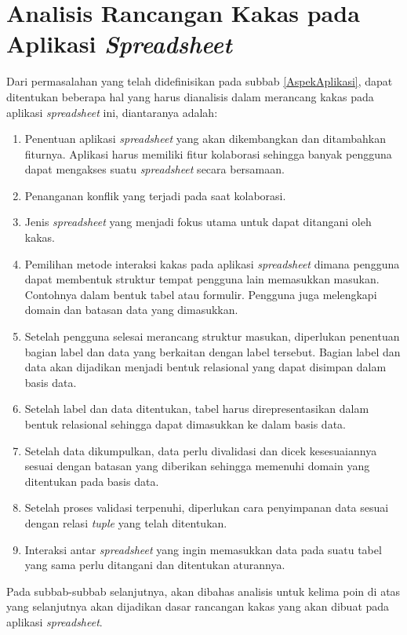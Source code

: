 \section{Analisis Rancangan Kakas pada Aplikasi \textit{Spreadsheet}}
Dari permasalahan yang telah didefinisikan pada subbab \ref{AspekAplikasi}, dapat ditentukan beberapa hal yang harus dianalisis dalam merancang kakas pada aplikasi \textit{spreadsheet} ini, diantaranya adalah:
\begin{enumerate}
	\item Penentuan aplikasi \textit{spreadsheet} yang akan dikembangkan dan ditambahkan fiturnya. Aplikasi harus memiliki fitur kolaborasi sehingga banyak pengguna dapat mengakses suatu \textit{spreadsheet} secara bersamaan.
	\item Penanganan konflik yang terjadi pada saat kolaborasi.
	\item Jenis \textit{spreadsheet} yang menjadi fokus utama untuk dapat ditangani oleh kakas.
	\item Pemilihan metode interaksi kakas pada aplikasi \textit{spreadsheet} dimana pengguna dapat membentuk struktur tempat pengguna lain memasukkan masukan. Contohnya dalam bentuk tabel atau formulir. Pengguna juga melengkapi domain dan batasan data yang dimasukkan.
	\item Setelah pengguna selesai merancang struktur masukan, diperlukan penentuan bagian label dan data yang berkaitan dengan label tersebut. Bagian label dan data akan dijadikan menjadi bentuk relasional yang dapat disimpan dalam basis data.
	\item Setelah label dan data ditentukan, tabel harus direpresentasikan dalam bentuk relasional sehingga dapat dimasukkan ke dalam basis data.
	\item Setelah data dikumpulkan, data perlu divalidasi dan dicek kesesuaiannya sesuai dengan batasan yang diberikan sehingga memenuhi domain yang ditentukan pada basis data.
	\item Setelah proses validasi terpenuhi, diperlukan cara penyimpanan data sesuai dengan relasi \textit{tuple} yang telah ditentukan.
	\item Interaksi antar \textit{spreadsheet} yang ingin memasukkan data pada suatu tabel yang sama perlu ditangani dan ditentukan aturannya.
\end{enumerate}
Pada subbab-subbab selanjutnya, akan dibahas analisis untuk kelima poin di atas yang selanjutnya akan dijadikan dasar rancangan kakas yang akan dibuat pada aplikasi \textit{spreadsheet}.

